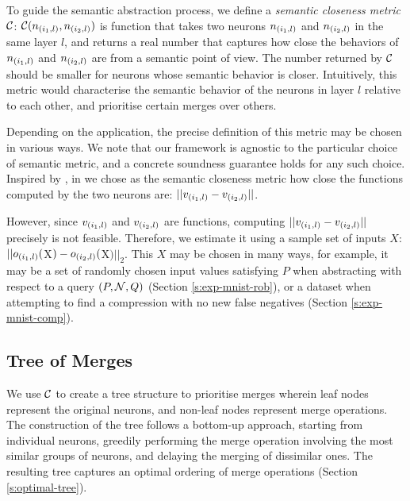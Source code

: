 
To guide the semantic abstraction process, we define a \textit{semantic
closeness metric} $\mathcal{C}$: $\mathcal{C}(n_{(i_1,l)}, n_{(i_2,l)})$ is function that
takes two neurons $n_{(i_1,l)}$ and $n_{(i_2,l)}$ in
the same layer $l$, and returns a real number that
captures how close the behaviors of $n_{(i_1,l)}$ and $n_{(i_2,l)}$ are from a
semantic point of view. The number returned by $\mathcal{C}$ should be smaller for
neurons whose semantic behavior is closer. Intuitively, this metric would
characterise the semantic behavior of the
neurons in layer $l$ relative to each other, and prioritise certain merges over
others. 

Depending on the application, the precise definition of this metric may be
chosen in various ways. We note that our framework is agnostic to the particular
choice of semantic metric, and a concrete soundness guarantee holds for any such
choice. Inspired by \cite{deep-abstract}, in we chose as the
semantic closeness metric how close the functions computed by the two neurons
are: $||v_{(i_1,l)} - v_{(i_2,l)}||$. 

However, since $v_{(i_1,l)}$ and $v_{(i_2,l)}$ are functions, computing
$||v_{(i_1,l)} - v_{(i_2,l)}||$ precisely is not feasible.
Therefore, we estimate it using a sample set of inputs $X$: $||o_{(i_1,l)}($X$)
- o_{(i_2,l)}($X$)||_2$. This $X$ may be chosen in many ways, for example, it
may be a set of randomly chosen input values satisfying $P$ when
abstracting with respect to a query $(P, \mathcal{N}, Q)$
(Section \ref{s:exp-mnist-rob}), or a dataset when attempting to find a
compression with no new false negatives (Section \ref{s:exp-mnist-comp}).

\subsection{Tree of Merges}
\label{s:tree}

We use $\mathcal{C}$ to create a tree structure to prioritise merges wherein leaf nodes
represent the original neurons, and 
non-leaf nodes represent merge operations. The construction of the tree 
follows a bottom-up approach, starting from individual neurons, 
greedily performing the merge operation involving the most similar groups of
neurons, and delaying the merging of dissimilar ones. The resulting tree
captures an optimal ordering of merge operations (Section \ref{s:optimal-tree}).

